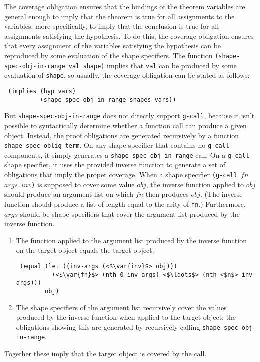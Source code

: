 \documentclass[submission,copyright,creativecommons]{eptcs}
\newcommand*{\var}[1]{\mathit{#1}}
\begin{document}
The coverage obligation ensures that the bindings of the theorem
variables are general enough to imply that the theorem is true for all
assignments to the variables; more specifically, to imply that the
conclusion is true for all assignments satisfying the hypothesis.  To
do this, the coverage obligation ensures that every assignment of the
variables satisfying the hypothesis can be reproduced by some
evaluation of the shape specifiers.  The function
\texttt{(shape-spec-obj-in-range val shape)} implies that \texttt{val}
can be produced by some evaluation of \texttt{shape}, so usually, the
coverage obligation can be stated as follows:
\begin{verbatim}
 (implies (hyp vars)
          (shape-spec-obj-in-range shapes vars))
\end{verbatim}
\noindent But \texttt{shape-spec-obj-in-range} does not directly
support \texttt{g-call}, because it isn't possible to syntactically
determine whether a function call can produce a given object.
Instead, the proof obligations are generated recursively by a function
\texttt{shape-spec-oblig-term}.  On any shape specifier that contains
no \texttt{g-call} components, it simply generates a
\texttt{shape-spec-obj-in-range} call.  On a \texttt{g-call} shape
specifier, it uses the provided inverse function to generate a set of
obligations that imply the proper coverage.  When a shape specifier
\texttt{(g-call $\var{fn}$ $\var{args}$ $\var{inv}$)} is supposed to
cover some value $\var{obj}$, the inverse function applied to
$\var{obj}$ should produce an argument list on which $\var{fn}$ then
produces $\var{obj}$.  (The inverse function should produce a list of
length equal to the arity of \texttt{fn}.)  Furthermore, $\var{args}$
should be shape specifiers that cover the argument list produced by
the inverse function.
\begin{enumerate}
\item The function applied to the argument list produced by the
  inverse function on the target object equals the target object:
\begin{lstlisting}
 (equal (let ((inv-args (<$\var{inv}$> obj)))
          (<$\var{fn}$> (nth 0 inv-args) <$\ldots$> (nth <$n$> inv-args)))
        obj)
\end{lstlisting}
\item The shape specifiers of the argument list recursively cover the
  values produced by the inverse function when applied to the target
  object: the obligations showing this are generated by recursively calling \texttt{shape-spec-obj-in-range}.
\end{enumerate}
Together these imply that the target object is covered by the call.
\end{document}
